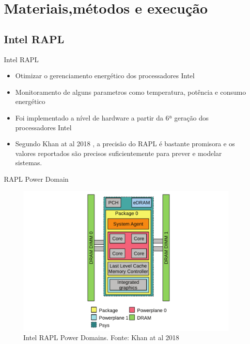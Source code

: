 \section{Materiais,métodos e execução}

\subsection{Intel RAPL}
\begin{frame}{Intel RAPL}
    \begin{itemize}
        \item Otimizar o gerenciamento energético dos processadores Intel
        \item Monitoramento de alguns parametros como temperatura, potência e consumo energético
        \item Foi implementado a nível de hardware a partir da 6ª geração dos processadores Intel
        \item Segundo Khan at al 2018 \cite{khan2018IntelRapl}, a precisão do RAPL é bastante promisora e os valores reportados são precisos suficientemente para prever e modelar sistemas.
    \end{itemize}
\end{frame}

\begin{frame}{RAPL Power Domain}
    \begin{figure}
        \centering
        \includegraphics[width=0.61\linewidth]{images/powerDomainsRAPL.png}
        \caption{Intel RAPL Power Domains. Fonte: Khan at al 2018 \cite{khan2018IntelRapl}}
        \label{fig:powerDomains}
    \end{figure}
\end{frame}

